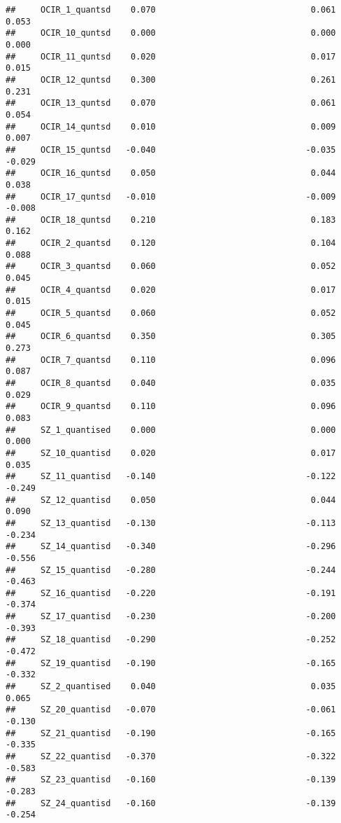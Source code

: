 \documentclass[]{article}
\begin{document}
\begin{verbatim}
##     OCIR_1_quantsd    0.070                               0.061    0.053
##     OCIR_10_quntsd    0.000                               0.000    0.000
##     OCIR_11_quntsd    0.020                               0.017    0.015
##     OCIR_12_quntsd    0.300                               0.261    0.231
##     OCIR_13_quntsd    0.070                               0.061    0.054
##     OCIR_14_quntsd    0.010                               0.009    0.007
##     OCIR_15_quntsd   -0.040                              -0.035   -0.029
##     OCIR_16_quntsd    0.050                               0.044    0.038
##     OCIR_17_quntsd   -0.010                              -0.009   -0.008
##     OCIR_18_quntsd    0.210                               0.183    0.162
##     OCIR_2_quantsd    0.120                               0.104    0.088
##     OCIR_3_quantsd    0.060                               0.052    0.045
##     OCIR_4_quantsd    0.020                               0.017    0.015
##     OCIR_5_quantsd    0.060                               0.052    0.045
##     OCIR_6_quantsd    0.350                               0.305    0.273
##     OCIR_7_quantsd    0.110                               0.096    0.087
##     OCIR_8_quantsd    0.040                               0.035    0.029
##     OCIR_9_quantsd    0.110                               0.096    0.083
##     SZ_1_quantised    0.000                               0.000    0.000
##     SZ_10_quantisd    0.020                               0.017    0.035
##     SZ_11_quantisd   -0.140                              -0.122   -0.249
##     SZ_12_quantisd    0.050                               0.044    0.090
##     SZ_13_quantisd   -0.130                              -0.113   -0.234
##     SZ_14_quantisd   -0.340                              -0.296   -0.556
##     SZ_15_quantisd   -0.280                              -0.244   -0.463
##     SZ_16_quantisd   -0.220                              -0.191   -0.374
##     SZ_17_quantisd   -0.230                              -0.200   -0.393
##     SZ_18_quantisd   -0.290                              -0.252   -0.472
##     SZ_19_quantisd   -0.190                              -0.165   -0.332
##     SZ_2_quantised    0.040                               0.035    0.065
##     SZ_20_quantisd   -0.070                              -0.061   -0.130
##     SZ_21_quantisd   -0.190                              -0.165   -0.335
##     SZ_22_quantisd   -0.370                              -0.322   -0.583
##     SZ_23_quantisd   -0.160                              -0.139   -0.283
##     SZ_24_quantisd   -0.160                              -0.139   -0.254

\end{verbatim}
\end{document}
